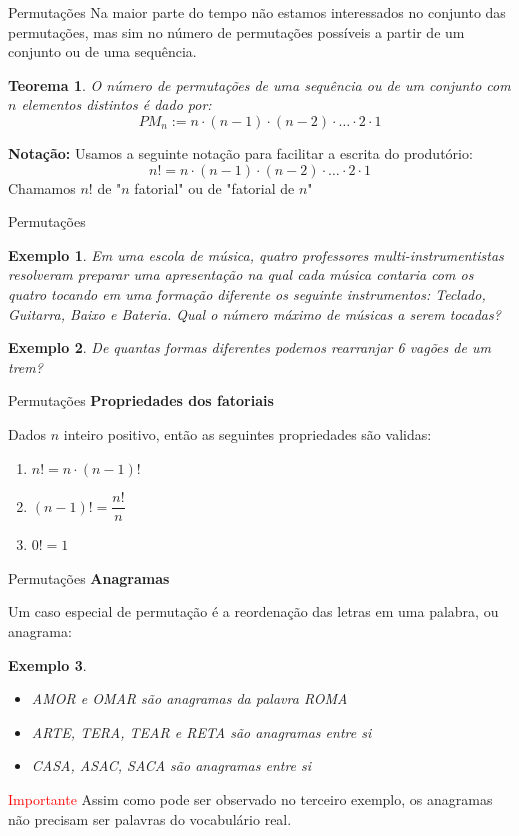 \documentclass{beamer}
\newtheorem{teorema}{Teorema}
\newtheorem{exemplo}{Exemplo}
\begin{document}
\begin{frame}{Permutações}
    Na maior parte do tempo não estamos interessados no conjunto das permutações, mas sim no número de permutações possíveis a partir de um conjunto ou de uma sequência.

    \begin{teorema}
        O número de permutações de uma sequência ou de um conjunto com $n$ elementos distintos é dado por:
        $$PM_n := n \cdot (n-1) \cdot (n-2) \cdot \dots \cdot 2 \cdot 1$$
    \end{teorema}

    \textbf{Notação:} Usamos a seguinte notação para facilitar a escrita do produtório:
    $$n! = n \cdot (n-1) \cdot (n-2) \cdot \dots \cdot 2 \cdot 1$$
Chamamos $n!$ de "$n$ fatorial" ou de "fatorial de $n$"
\end{frame}

\begin{frame}{Permutações}

\begin{exemplo}
    Em uma escola de música, quatro professores multi-instrumentistas resolveram preparar uma apresentação na qual cada música contaria com os quatro tocando em uma formação diferente os seguinte instrumentos: Teclado, Guitarra, Baixo e Bateria. Qual o número máximo de músicas a serem tocadas?
\end{exemplo}
    \pause
    \begin{exemplo}
        De quantas formas diferentes podemos rearranjar 6 vagões de um trem?
    \end{exemplo}
\end{frame}

\begin{frame}{Permutações}
\textbf{Propriedades dos fatoriais}

Dados $n$ inteiro positivo, então as seguintes propriedades são validas:

\begin{enumerate}
    \item $n! = n \cdot (n-1)!$
    \item $(n-1)! = \dfrac{n!}{n}$
    \item $0! = 1$
\end{enumerate}
\end{frame}
 \begin{frame}{Permutações}
 \textbf{Anagramas}

 Um caso especial de permutação é a reordenação das letras em uma palabra, ou anagrama:

 \begin{exemplo}
     \begin{itemize}
         \item AMOR e OMAR são anagramas da palavra ROMA
         \item ARTE, TERA, TEAR e RETA são anagramas entre si
         \item CASA, ASAC, SACA são anagramas entre si
     \end{itemize}
 \end{exemplo}
     \textcolor{red}{Importante} Assim como pode ser observado no terceiro exemplo, os anagramas não precisam ser palavras do vocabulário real.
 \end{frame}   
\end{document}

